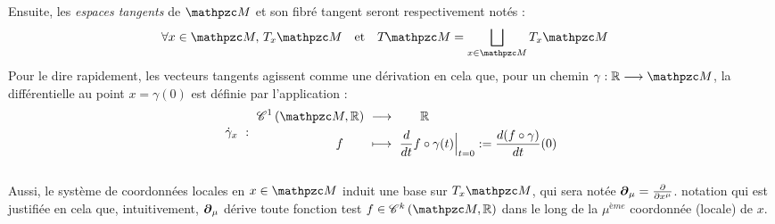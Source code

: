 Ensuite, les \emph{espaces tangents} de $\manu$  et son fibré tangent seront respectivement notés :
\begin{align}
	\qquad\qquad\qquad \forall x\in\manu,\ &\tg[x]{\manu}  & &\text{et}  &  \tg{\manu} &= \bigsqcup_{x\in\manu}\tg[x]{\manu} \qquad\qquad\qquad
\end{align} 
Pour le dire rapidement, les vecteurs tangents agissent comme une dérivation en cela que, pour un chemin $\gamma : \R\lr\manu$, la différentielle au point $x=\gamma(0)$ est définie par l'application :
\begin{equation} \label{eq:def2vec_tg}
	\dot{\gamma}_{x}\  :\ \begin{aligned}
		\conti[1]{\manu}{\R}\ &\lr\qquad \R \\ 
		f\qquad &\lmt\ \frac{d}{dt} f \circ\gamma(t)\Big|_{t=0} \defeq \frac{d(f \circ \gamma)}{dt}(0)
	\end{aligned}
\end{equation}
\\
Aussi, le système de coordonnées locales en $x\in\manu$ induit une base sur $\tg[x]{\manu}$, qui sera notée  $\boldsymbol{\partial}_\mu = \frac{\partial}{\partial x^\mu}$. notation qui est justifiée en cela que, intuitivement, $\boldsymbol{\partial}_\mu$ dérive toute fonction test $f\in\conti[k]{\manu}{\R}$ dans le long de la $\mu^{ème}$ coordonnée (locale) de $x$.
\\

